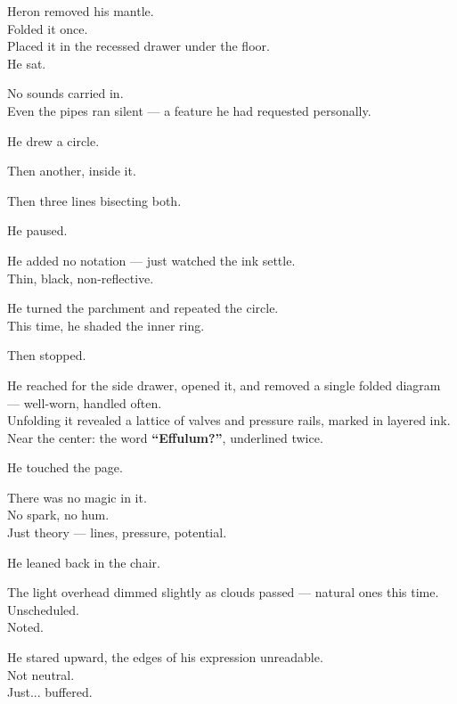 \documentclass[12pt]{article}
\begin{document}
\vspace{1em}

Heron removed his mantle.\\
Folded it once.\\
Placed it in the recessed drawer under the floor.\\
He sat.

No sounds carried in.\\
Even the pipes ran silent — a feature he had requested personally.

\vspace{1em}

He drew a circle.

Then another, inside it.

Then three lines bisecting both.

He paused.

He added no notation — just watched the ink settle.\\
Thin, black, non-reflective.

He turned the parchment and repeated the circle.\\
This time, he shaded the inner ring.

Then stopped.

\vspace{1em}

He reached for the side drawer, opened it, and removed a single folded diagram — well-worn, handled often.\\
Unfolding it revealed a lattice of valves and pressure rails, marked in layered ink.\\
Near the center: the word \textbf{“Effulum?”}, underlined twice.

He touched the page.

\vspace{1em}

There was no magic in it.\\
No spark, no hum.\\
Just theory — lines, pressure, potential.

\vspace{1em}

He leaned back in the chair.

The light overhead dimmed slightly as clouds passed — natural ones this time.\\
Unscheduled.\\
Noted.

He stared upward, the edges of his expression unreadable.\\
Not neutral.\\
Just... buffered.
\end{document}
